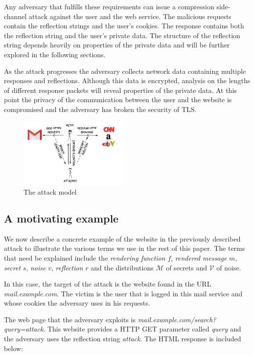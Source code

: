 \documentclass[conference, letterpaper, 10pt]{IEEEtran}
\begin{document}
Any adversary that fulfills these requirements can issue a compression
side-channel attack against the user and the web service. The malicious requests
contain the reflection strings and the user's cookies. The response contains
both the reflection string and the user's private data. The structure of the
reflection string depends heavily on properties of the private data and will be
further explored in the following sections.

As the attack progresses the adversary collects network data containing multiple
responses and reflections. Although this data is encrypted, analysis on the
lengths of different response packets will reveal properties of the private data.
At this point the privacy of the communication between the user and the website is
compromised and the adversary has broken the security of TLS.

    \begin{figure}[thpb]
        \centering
            \includegraphics[width=0.48\textwidth]{attack_model.png}
        \caption{The attack model}
        \label{fig:attack_model}
    \end{figure}

\subsection{A motivating example}\label{subsec:terms}
We now describe a concrete example of the website in the previously described
attack to illustrate the various terms we use in the rest of this paper.  The
terms that need be explained include the \textit{rendering function} $f$,
\textit{rendered message} $m$, \textit{secret} $s$, \textit{noise} $v$,
\textit{reflection} $r$ and the distributions $\mathcal{M}$ of secrets and
$\mathcal{V}$ of noise.

In this case, the target of the attack is the website found in the URL
\textit{mail.example.com}. The victim is the user that is logged in this mail
service and whose cookies the adversary uses in his requests.

The web page that the adversary exploits is
\textit{mail.example.com/search?query=attack}. This website provides a HTTP GET
parameter called \textit{query} and the adversary uses the reflection string
\textit{attack}. The HTML response is included below:
\end{document}
